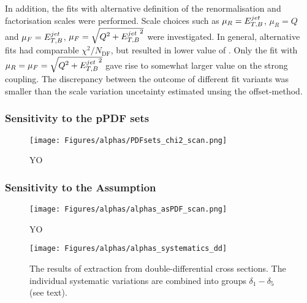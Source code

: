 In addition, the fits with alternative definition of the renormalisation and factorisation scales were performed. Scale choices such as $\mu_R=\mbox{$E_{T,B}^{jet}$}$, $\mu_R=Q$ and $\mu_F=\mbox{$E_{T,B}^{jet}$}$, $\mu_F=\sqrt{\mbox{${Q^2}$}+\mbox{$E_{T,B}^{jet}$}^2}$ were investigated. In general, alternative fits had comparable $\chi^2/N_\text{DF}$, but resulted in lower value of \asz. Only the fit with $\mu_R=\mu_F=\sqrt{\mbox{${Q^2}$}+\mbox{$E_{T,B}^{jet}$}^2}$ gave rise to somewhat larger value on the strong coupling. The discrepancy between the outcome of different fit variants was smaller than the scale variation uncetainty estimated unsing the offset-method.


\subsubsection{Sensitivity to the pPDF sets}
\label{subsec:aspdfassump}

\begin{figure}[t]
 \centering
 \texttt{[image: Figures/alphas/PDFsets\_chi2\_scan.png]}
 \caption{YO}
 \label{fig:chi2scanpdf}
\end{figure}

\subsubsection{Sensitivity to the \asz Assumption}
\label{subsec:asassump}

\begin{figure}[t]
 \centering
 \texttt{[image: Figures/alphas/alphas\_asPDF\_scan.png]}
 \caption{YO}
 \label{fig:chi2scanpdf}
\end{figure}

\begin{landscape}
\begin{figure}[p]
 \centering
 \caption{The results of \asz extraction from double-differential cross sections. The individual systematic variations are combined into groups $\delta_1-\delta_5$ (see text).}
 \label{fig:asthunc_dd}
 \texttt{[image: Figures/alphas/alphas\_systematics\_dd]}
\end{figure}
\end{landscape}